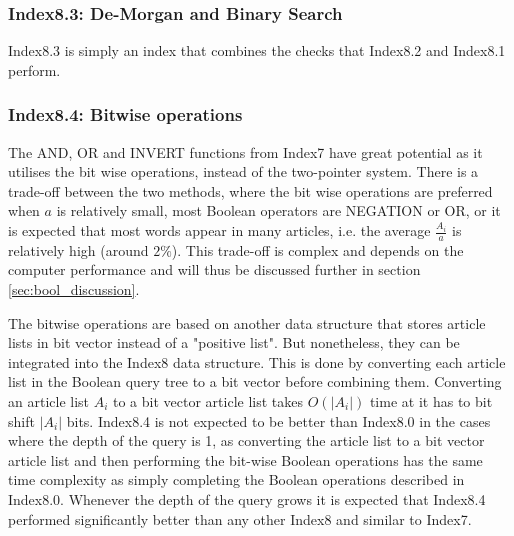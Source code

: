 \subsubsection{Index8.3: De-Morgan and Binary Search}
Index8.3 is simply an index that combines the checks that Index8.2 and Index8.1 perform. 

\subsubsection{Index8.4: Bitwise operations}
The AND, OR and INVERT functions from Index7 have great potential as it utilises the bit wise operations, instead of the two-pointer system. There is a trade-off between the two methods, where the bit wise operations are preferred when $a$ is relatively small, most Boolean operators are NEGATION or OR, or it is expected that most words appear in many articles, i.e. the average $\frac{A_i}{a}$ is relatively high (around $2\%$). This trade-off is complex and depends on the computer performance and will thus be discussed further in section \ref{sec:bool_discussion}. 

The bitwise operations are based on another data structure that stores article lists in bit vector instead of a "positive list". But nonetheless, they can be integrated into the Index8 data structure. This is done by converting each article list in the Boolean query tree to a bit vector before combining them. Converting an article list $A_i$ to a bit vector article list takes $O(|A_i|)$ time at it has to bit shift $|A_i|$ bits. Index8.4 is not expected to be better than Index8.0 in the cases where the depth of the query is 1, as converting the article list to a bit vector article list and then performing the bit-wise Boolean operations has the same time complexity as simply completing the Boolean operations described in Index8.0. Whenever the depth of the query grows it is expected that Index8.4 performed significantly better than any other Index8 and similar to Index7.

